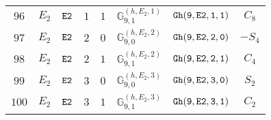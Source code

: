 \documentclass[fleqn,8pt]{jsarticle}
\begin{document}
\begin{table}[ht!]
\begin{center}
\begin{tabular}{cccccccc}
$ 96 $ & $ E_{2} $ & $ {\tt E2} $ & $ 1 $ & $ 1 $ & $ \mathbb{G}_{9,1}^{(h,E_{2},1)} $ & $ {\tt Gh(9,E2,1,1)} $ & $ C_{8} $ \\
$ 97 $ & $ E_{2} $ & $ {\tt E2} $ & $ 2 $ & $ 0 $ & $ \mathbb{G}_{9,0}^{(h,E_{2},2)} $ & $ {\tt Gh(9,E2,2,0)} $ & $ - S_{4} $ \\
$ 98 $ & $ E_{2} $ & $ {\tt E2} $ & $ 2 $ & $ 1 $ & $ \mathbb{G}_{9,1}^{(h,E_{2},2)} $ & $ {\tt Gh(9,E2,2,1)} $ & $ C_{4} $ \\
$ 99 $ & $ E_{2} $ & $ {\tt E2} $ & $ 3 $ & $ 0 $ & $ \mathbb{G}_{9,0}^{(h,E_{2},3)} $ & $ {\tt Gh(9,E2,3,0)} $ & $ S_{2} $ \\
$ 100 $ & $ E_{2} $ & $ {\tt E2} $ & $ 3 $ & $ 1 $ & $ \mathbb{G}_{9,1}^{(h,E_{2},3)} $ & $ {\tt Gh(9,E2,3,1)} $ & $ C_{2} $ \\
 \hline \hline
\end{tabular}
\end{center}
\end{table}
\end{document}
